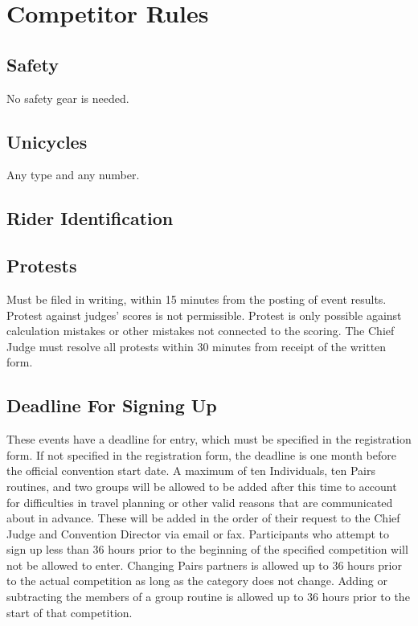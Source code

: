 \chapter{Competitor Rules}

\section{Safety}

No safety gear is needed.

\section{Unicycles}

Any type and any number.

\section{Rider Identification}

\section{Protests}

Must be filed in writing, within 15 minutes from the posting of event results.
Protest against judges' scores is not permissible.
Protest is only possible against calculation mistakes or other mistakes not connected to the scoring.
The Chief Judge must resolve all protests within 30 minutes from receipt of the written form.

\section{Deadline For Signing Up}
These events have a deadline for entry, which must be specified in the registration form.
If not specified in the registration form, the deadline is one month before the official convention start date.
A maximum of ten Individuals, ten Pairs routines, and two groups will be allowed to be added after this time to account for difficulties in travel planning or other valid reasons that are communicated about in advance.
These will be added in the order of their request to the Chief Judge and Convention Director via email or fax.
Participants who attempt to sign up less than 36 hours prior to the beginning of the specified competition will not be allowed to enter.
Changing Pairs partners is allowed up to 36 hours prior to the actual competition as long as the category does not change.
Adding or subtracting the members of a group routine is allowed up to 36 hours prior to the start of that competition.

